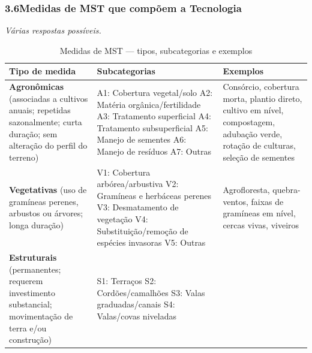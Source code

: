 \subsubsection*{3.6\quad Medidas de MST que compõem a Tecnologia}
\textit{Várias respostas possíveis.}

\begin{table}[htbp]
\centering\small
\caption{Medidas de MST --- tipos, subcategorias e exemplos}
\label{tab:app_slm_measures}
\begin{tabular}{p{3cm}p{4cm}p{7cm}}
\toprule
\textbf{Tipo de medida} & \textbf{Subcategorias} & \textbf{Exemplos} \\
\midrule
\textbf{Agronômicas} \newline
(associadas a cultivos anuais; repetidas sazonalmente; curta duração; sem alteração do perfil do terreno) &
  A1: Cobertura vegetal/solo \newline
  A2: Matéria orgânica/fertilidade \newline
  A3: Tratamento superficial \newline
  A4: Tratamento subsuperficial \newline
  A5: Manejo de sementes \newline
  A6: Manejo de resíduos \newline
  A7: Outras &
  Consórcio, cobertura morta, plantio direto, cultivo em nível, compostagem, adubação verde, rotação de culturas, seleção de sementes \\
\addlinespace
\textbf{Vegetativas} \newline
(uso de gramíneas perenes, arbustos ou árvores; longa duração) &
  V1: Cobertura arbórea/arbustiva \newline
  V2: Gramíneas e herbáceas perenes \newline
  V3: Desmatamento de vegetação \newline
  V4: Substituição/remoção de espécies invasoras \newline
  V5: Outras &
  Agrofloresta, quebra-ventos, faixas de gramíneas em nível, cercas vivas, viveiros \\
\addlinespace
\textbf{Estruturais} \newline
(permanentes; requerem investimento substancial; movimentação de terra e/ou construção) &
  S1: Terraços \newline
  S2: Cordões/camalhões \newline
  S3: Valas graduadas/canais \newline
  S4: Valas/covas niveladas \newline

\end{tabular}
\end{table}
